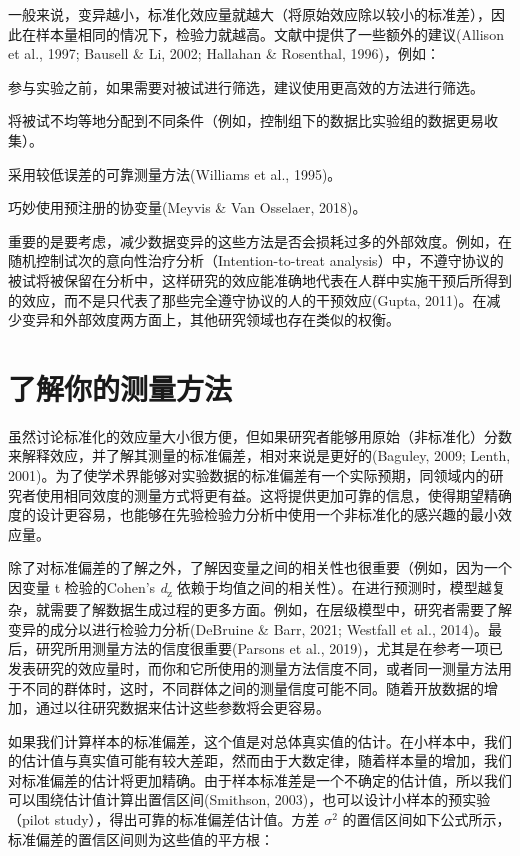 \documentclass[
  letterpaper,
  DIV=11,
  numbers=noendperiod]{scrreprt}
\begin{document}
一般来说，变异越小，标准化效应量就越大（将原始效应除以较小的标准差），因此在样本量相同的情况下，检验力就越高。文献中提供了一些额外的建议(Allison
et al., 1997; Bausell \& Li, 2002; Hallahan \& Rosenthal, 1996)，例如：

参与实验之前，如果需要对被试进行筛选，建议使用更高效的方法进行筛选。

将被试不均等地分配到不同条件（例如，控制组下的数据比实验组的数据更易收集）。

采用较低误差的可靠测量方法(Williams et al., 1995)。

巧妙使用预注册的协变量(Meyvis \& Van Osselaer, 2018)。

重要的是要考虑，减少数据变异的这些方法是否会损耗过多的外部效度。例如，在随机控制试次的意向性治疗分析（Intention-to-treat
analysis）中，不遵守协议的被试将被保留在分析中，这样研究的效应能准确地代表在人群中实施干预后所得到的效应，而不是只代表了那些完全遵守协议的人的干预效应(Gupta,
2011)。在减少变异和外部效度两方面上，其他研究领域也存在类似的权衡。

\hypertarget{sec-knowyourmeasure}{%
\section{了解你的测量方法}\label{sec-knowyourmeasure}}

虽然讨论标准化的效应量大小很方便，但如果研究者能够用原始（非标准化）分数来解释效应，并了解其测量的标准偏差，相对来说是更好的(Baguley,
2009; Lenth,
2001)。为了使学术界能够对实验数据的标准偏差有一个实际预期，同领域内的研究者使用相同效度的测量方式将更有益。这将提供更加可靠的信息，使得期望精确度的设计更容易，也能够在先验检验力分析中使用一个非标准化的感兴趣的最小效应量。

除了对标准偏差的了解之外，了解因变量之间的相关性也很重要（例如，因为一个因变量
t 检验的Cohen's \emph{d}\textsubscript{z}
依赖于均值之间的相关性）。在进行预测时，模型越复杂，就需要了解数据生成过程的更多方面。例如，在层级模型中，研究者需要了解变异的成分以进行检验力分析(DeBruine
\& Barr, 2021; Westfall et al.,
2014)。最后，研究所用测量方法的信度很重要(Parsons et al.,
2019)，尤其是在参考一项已发表研究的效应量时，而你和它所使用的测量方法信度不同，或者同一测量方法用于不同的群体时，这时，不同群体之间的测量信度可能不同。随着开放数据的增加，通过以往研究数据来估计这些参数将会更容易。

如果我们计算样本的标准偏差，这个值是对总体真实值的估计。在小样本中，我们的估计值与真实值可能有较大差距，然而由于大数定律，随着样本量的增加，我们对标准偏差的估计将更加精确。由于样本标准差是一个不确定的估计值，所以我们可以围绕估计值计算出置信区间(Smithson,
2003)，也可以设计小样本的预实验（pilot
study），得出可靠的标准偏差估计值。方差 \(\sigma^2\)
的置信区间如下公式所示，标准偏差的置信区间则为这些值的平方根：
\end{document}
